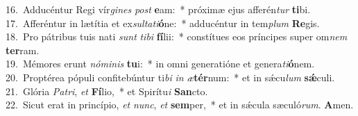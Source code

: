 {16.~}Adducéntur Regi vír\textit{gi}\textit{nes} \textit{post} \textbf{e}am:~* próximæ ejus afferén\textit{tur} \textbf{ti}bi.\\
{17.~}Afferéntur in lætítia et ex\textit{sul}\textit{ta}\textit{ti}\textbf{ó}ne:~* adducéntur in tem\textit{plum} \textbf{Re}gis.\\
{18.~}Pro pátribus tuis nati \textit{sunt} \textit{ti}\textit{bi} \textbf{fí}lii:~* constítues eos príncipes super om\textit{nem} \textbf{ter}ram.\\
{19.~}Mémores erunt \textit{nó}\textit{mi}\textit{nis} \textbf{tu}i:~* in omni generatióne et genera\textit{ti}\textbf{ó}nem.\\
{20.~}Proptérea pópuli confitebúntur ti\textit{bi} \textit{in} \textit{æ}\textbf{tér}num:~* et in sǽcu\textit{lum} \textbf{sǽ}culi.\\
{21.~}Glória \textit{Pa}\textit{tri}, \textit{et} \textbf{Fí}lio,~* et Spirítu\textit{i} \textbf{San}cto.\\
{22.~}Sicut erat in princípio, \textit{et} \textit{nunc}, \textit{et} \textbf{sem}per,~* et in sǽcula sæculó\textit{rum}. \textbf{A}men.\\
